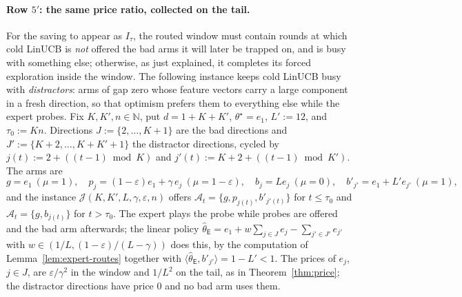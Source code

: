 \documentclass[anon]{alt2027} %
\newcommand{\N}{\mathbb{N}}
\newcommand{\eps}{\varepsilon}
\newcommand{\Exp}{\mathsf{E}}
\begin{document}
\paragraph{Row $5'$: the same price ratio, collected on the tail.}
For the saving to appear as $I_\tau$, the routed window must contain rounds
at which cold LinUCB is \emph{not} offered the bad arms it will later be
trapped on, and is busy with something else; otherwise, as just explained, it
completes its forced exploration inside the window. The following instance
keeps cold LinUCB busy with \emph{distractors}: arms of gap zero whose
feature vectors carry a large component in a fresh direction, so that
optimism prefers them to everything else while the expert probes. Fix
$K,K',n\in\N$, put $d=1+K+K'$, $\theta^\star=e_1$, $L':=12$, and
$\tau_0:=Kn$. Directions $J:=\{2,\dots,K+1\}$ are the bad directions and
$J':=\{K+2,\dots,K+K'+1\}$ the distractor directions, cycled by
$j(t):=2+((t-1)\bmod K)$ and $j'(t):=K+2+((t-1)\bmod K')$. The arms are
\[
g=e_1\ (\mu=1),\quad p_j=(1-\eps)e_1+\gamma\,e_j\ (\mu=1-\eps),\quad
b_j=Le_j\ (\mu=0),\quad b'_{j'}=e_1+L'e_{j'}\ (\mu=1),
\]
and the instance $\mathcal J(K,K',L,\gamma,\eps,n)$ offers
$\mathcal A_t=\{g,p_{j(t)},b'_{j'(t)}\}$ for $t\le\tau_0$ and
$\mathcal A_t=\{g,b_{j(t)}\}$ for $t>\tau_0$. The expert plays the probe while
probes are offered and the bad arm afterwards; the linear policy
$\widehat\theta_{\Exp}=e_1+w\sum_{j\in J}e_j-\sum_{j'\in J'}e_{j'}$ with
$w\in(1/L,(1-\eps)/(L-\gamma))$ does this, by the computation of
Lemma~\ref{lem:expert-routes} together with $\langle\widehat\theta_{\Exp},b'_{j'}\rangle=1-L'<1$.
The prices of $e_j$, $j\in J$, are $\eps/\gamma^2$ in the window and $1/L^2$ on
the tail, as in Theorem~\ref{thm:price}; the distractor directions have
price $0$ and no bad arm uses them.
\end{document}
